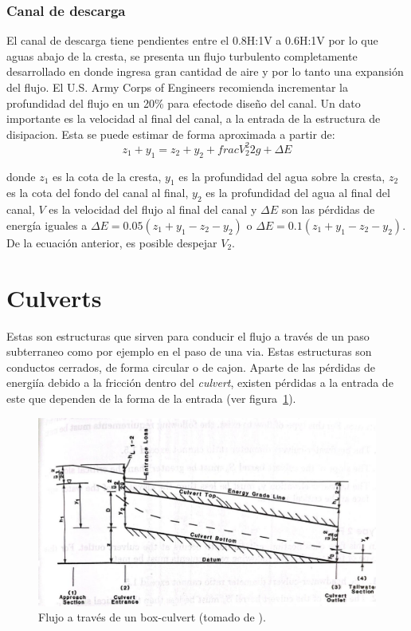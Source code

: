 \documentclass[11pt, oneside]{article}
\begin{document}
\subsubsection{Canal de descarga}
El canal de descarga tiene pendientes entre el 0.8H:1V a 0.6H:1V por lo que aguas abajo de la cresta, se presenta un flujo turbulento completamente desarrollado en donde ingresa gran cantidad de aire y por lo tanto una expansi\'on del flujo. El U.S. Army Corps of Engineers recomienda incrementar la profundidad del flujo en un 20\% para efectode diseño del canal. Un dato importante es la velocidad al final del canal, a la entrada de la estructura de disipacion. Esta se puede estimar de forma aproximada a partir de:
\begin{equation}
    z_1 + y_1 = z_2 + y_2 + frac{V_2^2}{2g} + \Delta E
    \label{eq28}
\end{equation}

donde $z_1$ es la cota de la cresta, $y_1$ es la profundidad del agua sobre la cresta, $z_2$ es la cota del fondo del canal al final, $y_2$ es la profundidad del agua al final del canal, $V$ es la velocidad del flujo al final del canal y $\Delta E$ son las p\'erdidas de energ\'ia iguales a $\Delta E = 0.05\left(z_1 + y_1 - z_2 - y_2\right)$ o $\Delta E = 0.1\left(z_1 + y_1 - z_2 - y_2\right)$. De la ecuaci\'on anterior, es posible despejar $V_2$.

\section{Culverts}
Estas son estructuras que sirven para conducir el flujo a trav\'es de un paso subterraneo como por ejemplo en el paso de una via. Estas estructuras son conductos cerrados, de forma circular o de cajon. Aparte de las p\'erdidas de energi\'ia debido a la fricci\'on dentro del \emph{culvert}, existen p\'erdidas a la entrada de este que dependen de la forma de la entrada (ver figura~\ref{fig825}).
\begin{figure}[h]
    \centering
    \includegraphics[width=0.8\linewidth]{fig825.jpeg}
    \caption{Flujo a trav\'es de un box-culvert (tomado de \cite{French}).}
    \label{fig825}
\end{figure}
\end{document}
